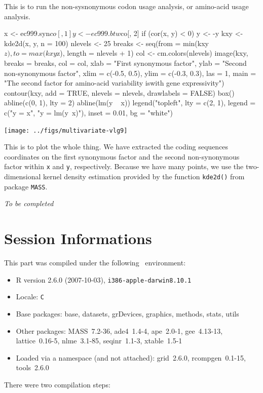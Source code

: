 \documentclass{article}
\begin{document}
This is to run the non-sysnonymous codon usage analysis, or amino-acid usage analysis.

\begin{Schunk}
\begin{Sinput}
 x <- ec999.syn$co[, 1]
 y <- ec999.btw$co[, 2]
 if (cor(x, y) < 0) y <- -y
 kxy <- kde2d(x, y, n = 100)
 nlevels <- 25
 breaks <- seq(from = min(kxy$z), to = max(kxy$z), length = nlevels + 
     1)
 col <- cm.colors(nlevels)
 image(kxy, breaks = breaks, col = col, xlab = "First synonymous factor", 
     ylab = "Second non-synonymous factor", xlim = c(-0.5, 
         0.5), ylim = c(-0.3, 0.3), las = 1, main = "The second factor for amino-acid variability is\ncorrelated with gene expressivity")
 contour(kxy, add = TRUE, nlevels = nlevels, drawlabels = FALSE)
 box()
 abline(c(0, 1), lty = 2)
 abline(lm(y ~ x))
 legend("topleft", lty = c(2, 1), legend = c("y = x", "y = lm(y~x)"), 
     inset = 0.01, bg = "white")
\end{Sinput}
\end{Schunk}
\texttt{[image: ../figs/multivariate-vlg9]}

This is to plot the whole thing. We have extracted the coding sequences coordinates
on the first synonymous factor and the second non-synonymous factor within
\texttt{x} and \texttt{y}, respectively. Because we have many points, we
use the two-dimensional kernel density estimation provided by the function
\texttt{kde2d()} from package \texttt{MASS}.


%
%

\textit{To be completed}




\section*{Session Informations}

This part was compiled under the following \Rlogo{}~environment:

\begin{itemize}
  \item R version 2.6.0 (2007-10-03), \verb|i386-apple-darwin8.10.1|
  \item Locale: \verb|C|
  \item Base packages: base, datasets, grDevices, graphics, methods,
    stats, utils
  \item Other packages: MASS~7.2-36, ade4~1.4-4, ape~2.0-1,
    gee~4.13-13, lattice~0.16-5, nlme~3.1-85, seqinr~1.1-3,
    xtable~1.5-1
  \item Loaded via a namespace (and not attached): grid~2.6.0,
    rcompgen~0.1-15, tools~2.6.0
\end{itemize}
There were two compilation steps:
\end{document}
